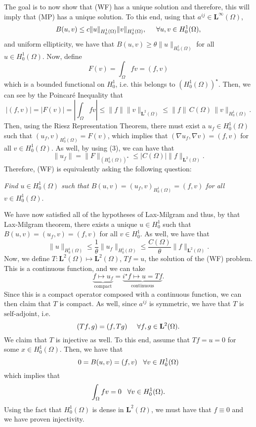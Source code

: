 \documentclass[12pt]{article}
\newcommand{\Om}{\Omega}
\newcommand{\dint}{\displaystyle\int}
\newcommand{\dintom}{\dint_{\Om}}
\newcommand{\ml}{\mathbf{L}}
\newcommand{\aij}{a^{ij}}
\newcommand{\Hz}{H_0^1}
\newcommand{\Hzo}{H_0^1(\Om)}
\newcommand{\Hzod}{\left( H_0^1(\Om)\right)^{\star}}
\newcommand{\mlto}{\ml^2(\Om)}
\newcommand{\saj}{\text{self-adjoint}}
\newcommand{\is}{i^{\star}}
\begin{document}
The goal is to now show that (WF) has a unique solution and therefore, this will imply that (MP) has a unique solution. To this end, using that $\aij \in \ml^{\infty}(\Om)$,  
\[ B(u, v) \leq c \| u \|_{\Hzo} \| v \|_{\Hzo}, \hspace{5mm} \forall u, v \in \Hzo,\]
and uniform ellipticity, we have that $B(u, v) \geq \theta \| u \|_{\Hzo}$ for all $u \in \Hzo$. Now, define 
\[F(v) = \dintom fv = (f,v) \]
which is a bounded functional on $\Hz$, i.e. this belongs to $\Hzod$. Then, we can see by the Poincar\'e Inequality that 
\begin{equation}
|(f, v)| = |F(v)| = \left| \dintom fv \right| \leq \| f \| \| v \|_{\mlto} \leq \| f \| \,  C(\Om) \, \| v \|_{\Hzo}.
\end{equation}
Then, using the Riesz Representation Theorem, there must exist a $u_f \in \Hzo$ such that $(u_f, v)_{\Hzo} = F(v)$, which implies that $(\nabla u_f, \nabla v) = (f, v)$ for all $v \in \Hzo$. As well, by using (3), we can have that 
\[ \| u_f \| = \| F \|_{\Hzod} \leq |C(\Om)| \| f \|_{\mlto}.\]
Therefore, (WF) is equivalently asking the following question:
\vspace{-15pt}
\begin{center}
\textit{Find $u \in \Hzo$ such that $B(u, v) = (u_f, v)_{\Hzo} = (f, v)$ for all $v \in \Hzo$}.
\end{center}
We have now satisfied all of the hypotheses of Lax-Milgram and thus, by that Lax-Milgram theorem, there exists a unique $u \in \Hz$ such that $B(u, v) = (u_f, v) = (f, v)$ for all $v \in \Hz$. As well, we have that 
\[ \| u \|_{\Hzo} \leq \frac{1}{\theta} \| u_f \|_{\Hzo} \leq \frac{C(\Om)}{\theta} \| f \|_{\mlto}.\]
Now, we define $T: \mlto \mapsto \mlto$, $Tf = u$, the solution of the (WF) problem. This is a continuous function, and we can take 
\[ \underbrace{f \mapsto u_f}_{\text{compact}} = \underbrace{\is f \mapsto u = Tf}_{\text{continuous} }.\]
Since this is a compact operator composed with a continuous function, we can then claim that $T$ is compact. As well, since $\aij$ is symmetric, we have that $T$ is $\saj$, i.e.
\[ (Tf, g) = (f, Tg) \hspace{5mm} \forall f, g \in \mlto.\]
We claim that $T$ is injective as well. To this end, assume that $Tf = u = 0$ for some $x \in \Hzo$. Then, we have that 
\[ 0 = B(u, v) = (f, v) \hspace{3mm} \forall v \in \Hzo \]
which implies that 
\[ \dintom fv = 0 \hspace{3mm} \forall v \in \Hzo. \]
Using the fact that $\Hzo$ is dense in $\mlto$, we must have that $f \equiv 0$ and we have proven injectivity. \\
\end{document}
